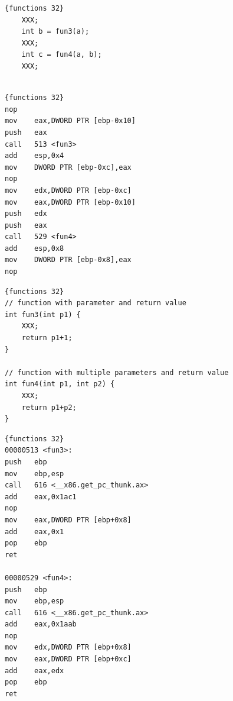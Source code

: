 \documentclass{report}
\begin{document}
\begin{minipage}{.45\textwidth}
\begin{lstlisting}[caption=Function calls,frame=tlrb]{functions 32}
    XXX;
    int b = fun3(a);
    XXX;
    int c = fun4(a, b);
    XXX;


\end{lstlisting}
\end{minipage}\hfill
\begin{minipage}{.45\textwidth}
\begin{lstlisting}[caption=assembly 32bit (Main),frame=tlrb]{functions 32}
nop
mov    eax,DWORD PTR [ebp-0x10]
push   eax
call   513 <fun3>
add    esp,0x4
mov    DWORD PTR [ebp-0xc],eax
nop
mov    edx,DWORD PTR [ebp-0xc]
mov    eax,DWORD PTR [ebp-0x10]
push   edx
push   eax
call   529 <fun4>
add    esp,0x8
mov    DWORD PTR [ebp-0x8],eax
nop

\end{lstlisting}
\end{minipage}
\begin{minipage}{.45\textwidth}
\begin{lstlisting}[caption=Function code (fun3 and fun4),frame=tlrb,framexrightmargin=-15pt]{functions 32}
// function with parameter and return value
int fun3(int p1) {
    XXX;
    return p1+1;
}

// function with multiple parameters and return value
int fun4(int p1, int p2) {
    XXX;
    return p1+p2;
}
\end{lstlisting}
\end{minipage}
\begin{minipage}{.45\textwidth}
\begin{lstlisting}[caption=assembly 32bit (fun3 and fun4),frame=tlrb]{functions 32}
00000513 <fun3>:
push   ebp
mov    ebp,esp
call   616 <__x86.get_pc_thunk.ax>
add    eax,0x1ac1
nop
mov    eax,DWORD PTR [ebp+0x8]
add    eax,0x1
pop    ebp
ret    

00000529 <fun4>:
push   ebp
mov    ebp,esp
call   616 <__x86.get_pc_thunk.ax>
add    eax,0x1aab
nop
mov    edx,DWORD PTR [ebp+0x8]
mov    eax,DWORD PTR [ebp+0xc]
add    eax,edx
pop    ebp
ret    



\end{lstlisting}
\end{minipage}
 \newline
 
\end{document}
